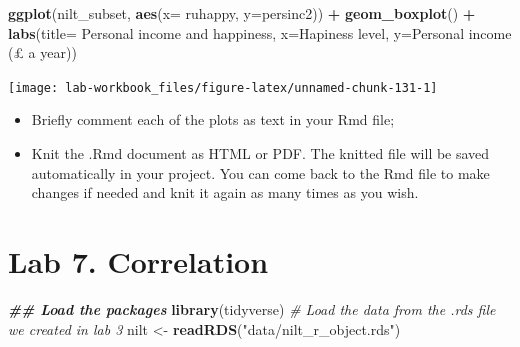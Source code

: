 \documentclass[
]{book}
\newenvironment{Shaded}{\begin{snugshade}}{\end{snugshade}}
\newcommand{\AttributeTok}[1]{\textcolor[rgb]{0.13,0.29,0.53}{#1}}
\newcommand{\CommentTok}[1]{\textcolor[rgb]{0.56,0.35,0.01}{\textit{#1}}}
\newcommand{\DocumentationTok}[1]{\textcolor[rgb]{0.56,0.35,0.01}{\textbf{\textit{#1}}}}
\newcommand{\FunctionTok}[1]{\textcolor[rgb]{0.13,0.29,0.53}{\textbf{#1}}}
\newcommand{\NormalTok}[1]{#1}
\newcommand{\OtherTok}[1]{\textcolor[rgb]{0.56,0.35,0.01}{#1}}
\newcommand{\SpecialCharTok}[1]{\textcolor[rgb]{0.81,0.36,0.00}{\textbf{#1}}}
\newcommand{\StringTok}[1]{\textcolor[rgb]{0.31,0.60,0.02}{#1}}
\providecommand{\tightlist}{%
  \setlength{\itemsep}{0pt}\setlength{\parskip}{0pt}}
\begin{document}
\begin{Shaded}
\begin{Highlighting}[]
\FunctionTok{ggplot}\NormalTok{(nilt\_subset, }\FunctionTok{aes}\NormalTok{(}\AttributeTok{x=}\NormalTok{ ruhappy, }\AttributeTok{y=}\NormalTok{persinc2)) }\SpecialCharTok{+}
  \FunctionTok{geom\_boxplot}\NormalTok{() }\SpecialCharTok{+}
  \FunctionTok{labs}\NormalTok{(}\AttributeTok{title=} \StringTok{\textquotesingle{}Personal income and happiness\textquotesingle{}}\NormalTok{, }
       \AttributeTok{x=}\StringTok{\textquotesingle{}Hapiness level\textquotesingle{}}\NormalTok{, }\AttributeTok{y=}\StringTok{\textquotesingle{}Personal income (£ a year)\textquotesingle{}}\NormalTok{)}
\end{Highlighting}
\end{Shaded}

\begin{flushleft}\texttt{[image: lab-workbook\_files/figure-latex/unnamed-chunk-131-1]} \end{flushleft}

\begin{itemize}
\tightlist
\item
  Briefly comment each of the plots as text in your Rmd file;
\item
  Knit the .Rmd document as HTML or PDF. The knitted file will be saved automatically in your project. You can come back to the Rmd file to make changes if needed and knit it again as many times as you wish.
\end{itemize}

\hypertarget{lab-7.-correlation}{%
\section{Lab 7. Correlation}\label{lab-7.-correlation}}

\begin{Shaded}
\begin{Highlighting}[]
\DocumentationTok{\#\# Load the packages}
\FunctionTok{library}\NormalTok{(tidyverse)}
\CommentTok{\# Load the data from the .rds file we created in lab 3}
\NormalTok{nilt }\OtherTok{\textless{}{-}} \FunctionTok{readRDS}\NormalTok{(}\StringTok{"data/nilt\_r\_object.rds"}\NormalTok{)}
\end{Highlighting}
\end{Shaded}

\begin{Shaded}
\end{Shaded}
\end{document}
